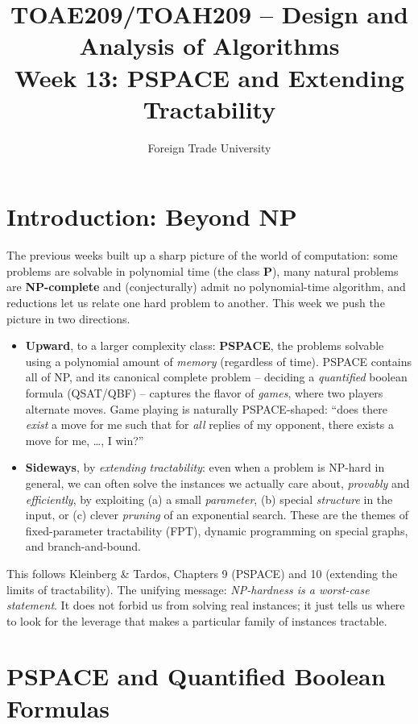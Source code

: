 \documentclass[11pt]{article}
\title{TOAE209/TOAH209 -- Design and Analysis of Algorithms\\[4pt]
\large Week 13: PSPACE and Extending Tractability}
\author{Foreign Trade University}
\date{}
\begin{document}
\maketitle
\tableofcontents

\section{Introduction: Beyond NP}

The previous weeks built up a sharp picture of the world of computation: some
problems are solvable in polynomial time (the class \textbf{P}), many natural
problems are \textbf{NP-complete} and (conjecturally) admit no polynomial-time
algorithm, and reductions let us relate one hard problem to another. This week
we push the picture in two directions.

\begin{itemize}
    \item \textbf{Upward}, to a larger complexity class: \textbf{PSPACE}, the
    problems solvable using a polynomial amount of \emph{memory} (regardless of
    time). PSPACE contains all of NP, and its canonical complete problem --
    deciding a \emph{quantified} boolean formula (QSAT/QBF) -- captures the
    flavor of \emph{games}, where two players alternate moves. Game playing is
    naturally PSPACE-shaped: ``does there \emph{exist} a move for me such that
    for \emph{all} replies of my opponent, there exists a move for me, \dots,
    I win?''

    \item \textbf{Sideways}, by \emph{extending tractability}: even when a
    problem is NP-hard in general, we can often solve the instances we actually
    care about, \emph{provably} and \emph{efficiently}, by exploiting (a) a
    small \emph{parameter}, (b) special \emph{structure} in the input, or (c)
    clever \emph{pruning} of an exponential search. These are the themes of
    fixed-parameter tractability (FPT), dynamic programming on special graphs,
    and branch-and-bound.
\end{itemize}

This follows Kleinberg \& Tardos, Chapters 9 (PSPACE) and 10 (extending the
limits of tractability). The unifying message: \emph{NP-hardness is a
worst-case statement}. It does not forbid us from solving real instances; it
just tells us where to look for the leverage that makes a particular family of
instances tractable.

\section{PSPACE and Quantified Boolean Formulas}
\end{document}
